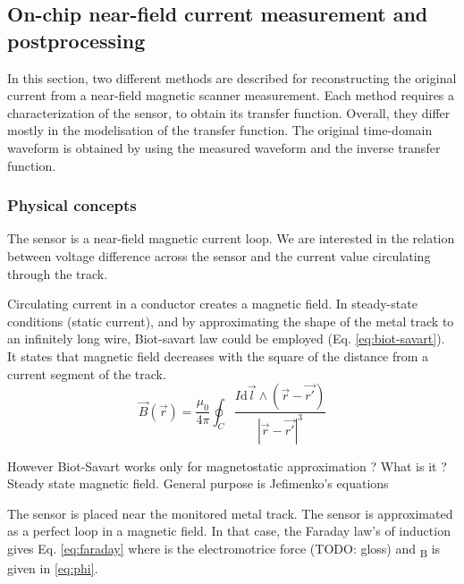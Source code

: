 \subsection{On-chip near-field current measurement and postprocessing}
\label{sec:on-chip-near-field-process}

In this section, two different methods are described for reconstructing the original current from a near-field magnetic scanner measurement.
Each method requires a characterization of the sensor, to obtain its transfer function.
Overall, they differ mostly in the modelisation of the transfer function.
The original time-domain waveform is obtained by using the measured waveform and the inverse transfer function.

\subsubsection{Physical concepts}
\label{sec:phys-concepts-nfs}

The sensor is a near-field magnetic current loop.
We are interested in the relation between voltage difference across the sensor and the current value circulating through the track.

Circulating current in a conductor creates a magnetic field.
In steady-state conditions (static current), and by approximating the shape of the metal track to an infinitely long wire, Biot-savart law could be employed (Eq. \ref{eq:biot-savart}).
It states that magnetic field decreases with the square of the distance from a current segment of the track.
\begin{equation}
  \label{eq:biot-savart}
  \overrightarrow{B}(\overrightarrow{r}) = \frac{\mu_{0}}{4\pi}\oint_{C}\frac{I \mathrm{d}\overrightarrow{l} \wedge (\overrightarrow{r} - \overrightarrow{r'}) }{|\overrightarrow{r} - \overrightarrow{r'}|^3}
\end{equation}

However Biot-Savart works only for magnetostatic approximation ? What is it ?
Steady state magnetic field.
General purpose is Jefimenko's equations

The sensor is placed near the monitored metal track.
The sensor is approximated as a perfect loop in a magnetic field.
In that case, the Faraday law's of induction gives Eq. \ref{eq:faraday}
where \textepsilon{} is the electromotrice force (TODO: gloss) and \textPhi{}\textsubscript{B} is given in \ref{eq:phi}.

